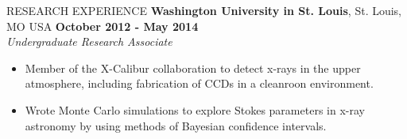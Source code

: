 \documentclass{resume} %
\begin{document}
\begin{rSection}{RESEARCH EXPERIENCE}
{\bf Washington University in St. Louis}, St. Louis, MO USA \hfill {\bf October 2012 - May 2014}\\
{\em Undergraduate Research Associate}%
\begin{itemize}
\vspace*{-.05in}
\item Member of the X-Calibur collaboration to detect x-rays in the upper atmosphere, including fabrication of CCDs in a cleanroon environment.
\item Wrote Monte Carlo simulations to explore Stokes parameters in x-ray astronomy by using methods of Bayesian confidence intervals.
\end{itemize}
\end{rSection}

\newpage
\end{document}
